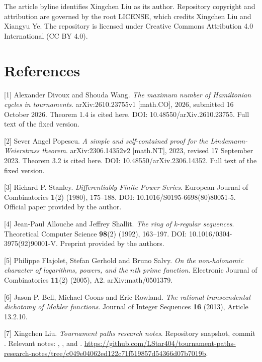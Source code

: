 \documentclass[11pt]{article}
\begin{document}
The article byline identifies Xingchen Liu as its author. Repository copyright and attribution are governed by the root LICENSE, which credits Xingchen Liu and Xiangyu Ye. The repository is licensed under Creative Commons Attribution 4.0 International (CC BY 4.0).

\section*{References}
\begingroup\small
[1] Alexander Divoux and Shouda Wang. \emph{The maximum number of Hamiltonian cycles in tournaments}. arXiv:2610.23755v1 [math.CO], 2026, submitted 16 October 2026. Theorem 1.4 is cited here. DOI: 10.48550/arXiv.2610.23755. Full text of the fixed version.

[2] Sever Angel Popescu. \emph{A simple and self-contained proof for the Lindemann-Weierstrass theorem}. arXiv:2306.14352v2 [math.NT], 2023, revised 17 September 2023. Theorem 3.2 is cited here. DOI: 10.48550/arXiv.2306.14352. Full text of the fixed version.

[3] Richard P. Stanley. \emph{Differentiably Finite Power Series}. European Journal of Combinatorics \textbf{1}(2) (1980), 175--188. DOI: 10.1016/S0195-6698(80)80051-5. Official paper provided by the author.

[4] Jean-Paul Allouche and Jeffrey Shallit. \emph{The ring of k-regular sequences}. Theoretical Computer Science \textbf{98}(2) (1992), 163--197. DOI: 10.1016/0304-3975(92)90001-V. Preprint provided by the authors.

[5] Philippe Flajolet, Stefan Gerhold and Bruno Salvy. \emph{On the non-holonomic character of logarithms, powers, and the $n$th prime function}. Electronic Journal of Combinatorics \textbf{11}(2) (2005), A2. arXiv:math/0501379.

[6] Jason P. Bell, Michael Coons and Eric Rowland. \emph{The rational-transcendental dichotomy of Mahler functions}. Journal of Integer Sequences \textbf{16} (2013), Article 13.2.10.

[7] Xingchen Liu. \emph{Tournament paths research notes}. Repository snapshot, commit . Relevant notes: , , and . \url{https://github.com/LStar404/tournament-paths-research-notes/tree/c049e04062ed122c71f519857d54366d07b7019b}.

\endgroup
\end{document}
